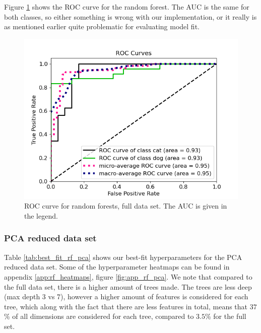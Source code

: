 \documentclass[a4paper]{article}
\begin{document}
Figure \ref{fig:rf_roc_nonpca} shows the ROC curve for the random forest. The AUC is the same for both classes, so either something is wrong with our implementation, or it really is as mentioned earlier quite problematic for evaluating model fit.
\begin{figure}[H]
	\centering
	\includegraphics[scale=0.6]{../figures/random_forest/roc_nbins200_pca0_seed4155_ts0.20.png}
	\caption{ROC curve for random forests, full data set. The AUC is given in the legend.}
	\label{fig:rf_roc_nonpca}
\end{figure}	

\subsubsection{PCA reduced data set}
Table \ref{tab:best_fit_rf_pca} shows our best-fit hyperparameters for the PCA reduced data set. Some of the hyperparameter heatmaps can be found in appendix \ref{app:rf_heatmaps}, figure \ref{fig:app_rf_pca}. We note that compared to the full data set, there is a higher amount of trees made. The trees are less deep (max depth 3 vs 7), however a higher amount of features is considered for each tree, which along with the fact that there are less features in total, means that $37$\% of all dimensions are considered for each tree, compared to $3.5$\% for the full set.
\end{document}
